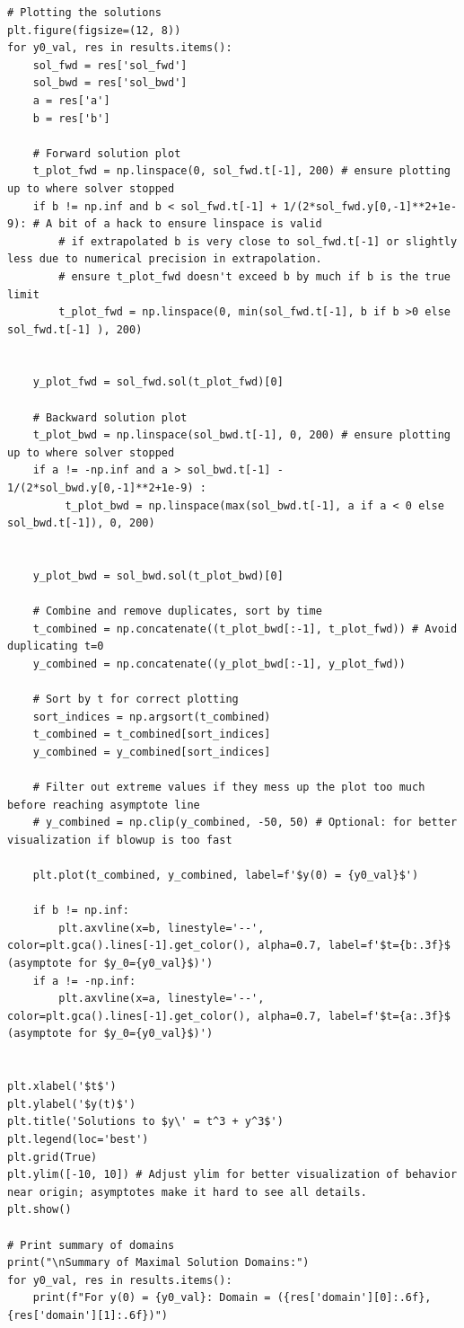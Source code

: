 \documentclass{article}
\begin{document}
\begin{verbatim}
# Plotting the solutions
plt.figure(figsize=(12, 8))
for y0_val, res in results.items():
    sol_fwd = res['sol_fwd']
    sol_bwd = res['sol_bwd']
    a = res['a']
    b = res['b']

    # Forward solution plot
    t_plot_fwd = np.linspace(0, sol_fwd.t[-1], 200) # ensure plotting up to where solver stopped
    if b != np.inf and b < sol_fwd.t[-1] + 1/(2*sol_fwd.y[0,-1]**2+1e-9): # A bit of a hack to ensure linspace is valid
        # if extrapolated b is very close to sol_fwd.t[-1] or slightly less due to numerical precision in extrapolation.
        # ensure t_plot_fwd doesn't exceed b by much if b is the true limit
        t_plot_fwd = np.linspace(0, min(sol_fwd.t[-1], b if b >0 else sol_fwd.t[-1] ), 200)


    y_plot_fwd = sol_fwd.sol(t_plot_fwd)[0]

    # Backward solution plot
    t_plot_bwd = np.linspace(sol_bwd.t[-1], 0, 200) # ensure plotting up to where solver stopped
    if a != -np.inf and a > sol_bwd.t[-1] - 1/(2*sol_bwd.y[0,-1]**2+1e-9) :
         t_plot_bwd = np.linspace(max(sol_bwd.t[-1], a if a < 0 else sol_bwd.t[-1]), 0, 200)


    y_plot_bwd = sol_bwd.sol(t_plot_bwd)[0]

    # Combine and remove duplicates, sort by time
    t_combined = np.concatenate((t_plot_bwd[:-1], t_plot_fwd)) # Avoid duplicating t=0
    y_combined = np.concatenate((y_plot_bwd[:-1], y_plot_fwd))

    # Sort by t for correct plotting
    sort_indices = np.argsort(t_combined)
    t_combined = t_combined[sort_indices]
    y_combined = y_combined[sort_indices]
    
    # Filter out extreme values if they mess up the plot too much before reaching asymptote line
    # y_combined = np.clip(y_combined, -50, 50) # Optional: for better visualization if blowup is too fast

    plt.plot(t_combined, y_combined, label=f'$y(0) = {y0_val}$')

    if b != np.inf:
        plt.axvline(x=b, linestyle='--', color=plt.gca().lines[-1].get_color(), alpha=0.7, label=f'$t={b:.3f}$ (asymptote for $y_0={y0_val}$)')
    if a != -np.inf:
        plt.axvline(x=a, linestyle='--', color=plt.gca().lines[-1].get_color(), alpha=0.7, label=f'$t={a:.3f}$ (asymptote for $y_0={y0_val}$)')


plt.xlabel('$t$')
plt.ylabel('$y(t)$')
plt.title('Solutions to $y\' = t^3 + y^3$')
plt.legend(loc='best')
plt.grid(True)
plt.ylim([-10, 10]) # Adjust ylim for better visualization of behavior near origin; asymptotes make it hard to see all details.
plt.show()

# Print summary of domains
print("\nSummary of Maximal Solution Domains:")
for y0_val, res in results.items():
    print(f"For y(0) = {y0_val}: Domain = ({res['domain'][0]:.6f}, {res['domain'][1]:.6f})")
\end{verbatim}
\end{document}
